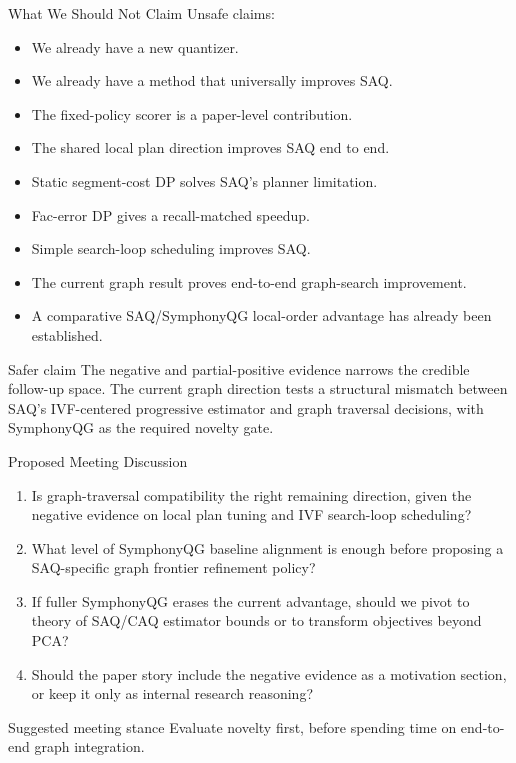 \documentclass[aspectratio=169,10pt]{beamer}
\begin{document}
\begin{frame}[fragile]{What We Should Not Claim}
\small
Unsafe claims:
\begin{itemize}
  \item We already have a new quantizer.
  \item We already have a method that universally improves SAQ.
  \item The fixed-policy scorer is a paper-level contribution.
  \item The shared local plan direction improves SAQ end to end.
  \item Static segment-cost DP solves SAQ's planner limitation.
  \item Fac-error DP gives a recall-matched speedup.
  \item Simple search-loop scheduling improves SAQ.
  \item The current graph result proves end-to-end graph-search improvement.
  \item A comparative SAQ/SymphonyQG local-order advantage has already been established.
\end{itemize}

\begin{block}{Safer claim}
The negative and partial-positive evidence narrows the credible follow-up
space. The current graph direction tests a structural mismatch between SAQ's
IVF-centered progressive estimator and graph traversal decisions, with
SymphonyQG as the required novelty gate.
\end{block}
\end{frame}

\begin{frame}[fragile]{Proposed Meeting Discussion}
\small
\begin{enumerate}
  \item Is graph-traversal compatibility the right remaining direction, given the negative evidence on local plan tuning and IVF search-loop scheduling?
  \item What level of SymphonyQG baseline alignment is enough before proposing a SAQ-specific graph frontier refinement policy?
  \item If fuller SymphonyQG erases the current advantage, should we pivot to theory of SAQ/CAQ estimator bounds or to transform objectives beyond PCA?
  \item Should the paper story include the negative evidence as a motivation section, or keep it only as internal research reasoning?
\end{enumerate}

\vspace{1em}
\begin{block}{Suggested meeting stance}
Evaluate novelty first, before spending time on end-to-end graph integration.
\end{block}
\end{frame}
\end{document}
